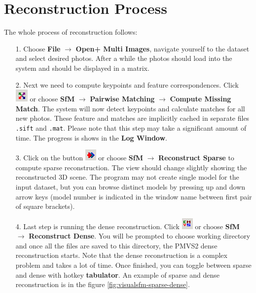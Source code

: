 \section{Reconstruction Process}
The whole process of reconstruction follows:
\begin{itemize}
	\item[1.] Choose \textbf{File} $\rightarrow$ \textbf{Open+ Multi Images}, navigate yourself to the dataset and select desired photos. After a while the photos should load into the system and should be displayed in a matrix.
	\item[2.] Next we need to compute keypoints and feature correspondences. Click \includegraphics[keepaspectratio,width=.5cm]{fig/visualsfm-compute-matches.png} or choose \textbf{SfM} $\rightarrow$ \textbf{Pairwise Matching} $\rightarrow$ \textbf{Compute Missing Match}. The system will now detect keypoints and calculate matches for all new photos. These feature and matches are implicitly cached in separate files \texttt{.sift} and \texttt{.mat}. Please note that this step may take a significant amount of time. The progress is shows in the \textbf{Log Window}.
	\item[3.] Click on the button \includegraphics[keepaspectratio,width=.5cm]{fig/visualsfm-sparse-reconstruction.png} or choose \textbf{SfM} $\rightarrow$ \textbf{Reconstruct Sparse} to compute sparse reconstruction. The view should change slightly showing the reconstructed 3D scene. The program may not create single model for the input dataset, but you can browse distinct models by pressing up and down arrow keys (model number is indicated in the window name between first pair of square brackets).
	\item[4.] Last step is running the dense reconstruction. Click \includegraphics[keepaspectratio,width=.5cm]{fig/visualsfm-dense-reconstruction.png} or choose \textbf{SfM} $\rightarrow$ \textbf{Reconstruct Dense}. You will be prompted to choose working directory and once all the files are saved to this directory, the PMVS2 dense reconstruction starts. Note that the dense reconstruction is a complex problem and takes a lot of time. Once finished, you can toggle between sparse and dense with hotkey \textbf{tabulator}. An example of sparse and dense reconstruction is in the figure \ref{fig:visualsfm-sparse-dense}.
\end{itemize}
